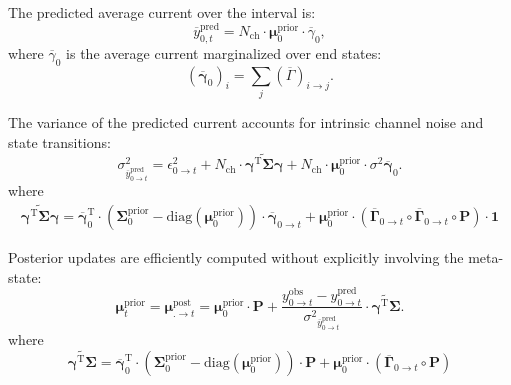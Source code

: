 \documentclass[pdflatex,sn-mathphys-num]{sn-jnl}%
\theoremstyle{thmstyleone}%
\theoremstyle{thmstyletwo}%
\theoremstyle{thmstylethree}%
\begin{document}
The predicted average current over the interval is:
\begin{equation}
	\overline{y}^{\text{pred}}_{0,t} = N_{\text{ch}} \cdot \mathbf{\mu}^{\text{prior}}_{0} \cdot \overline{\gamma}_{0},
	\label{eq:macro_interval_predicted_y}
\end{equation}
where \( \overline{\gamma}_{0} \) is the average current marginalized over end states:
\begin{equation}
	(\overline{\mathbf{\gamma}}_{0})_i = \sum_j (\overline{\Gamma})_{i \rightarrow j}.
\end{equation}

The variance of the predicted current accounts for intrinsic channel noise and state transitions:
\begin{equation}
	\sigma^2_{\overline{y}^{\text{pred}}_{0 \rightarrow t}} = \epsilon^2_{0 \rightarrow t} + N_{\text{ch}} \cdot \widetilde{\mathbf{\gamma}^{\mathrm{T}} \mathbf{\Sigma}\mathbf{\gamma}} + 
	N_{\text{ch}} \cdot \mathbf{\mu}^{\mathrm{prior}}_{0} \cdot {\sigma^2 \overline{\mathbf{\gamma}}}_{0}.
	\label{eq:macro_interval_sigma_pred}
\end{equation}
where
\begin{multline}
	\widetilde{\mathbf{\gamma}^{\mathrm{T}} \mathbf{\Sigma}\mathbf{\gamma}}= 
	\overline{\mathbf{\gamma}}_{0}^{\mathrm{T}} \cdot 
	\left( \mathbf{\Sigma}^{\mathrm{prior}}_{0} - \mathrm{diag}(\mathbf{\mu}^{\mathrm{prior}}_0) \right) \cdot 
	\overline{\mathbf{\gamma}}_{0 \rightarrow t} 
	+ \mathbf{\mu}^{\mathrm{prior}}_0 \cdot \left( \overline{\mathbf{\Gamma}}_{0 \rightarrow t} \circ \overline{\mathbf{\Gamma}}_{0 \rightarrow t} \circ \mathbf{P} \right) \cdot \mathbf{1}
	\label{eq:simplified_meta_state}
\end{multline}



Posterior updates are efficiently computed without explicitly involving the meta-state:
\begin{equation}
	\boldsymbol{\mu}^{\mathrm{prior}}_{t} = \boldsymbol{\mu}^{\mathrm{post}}_{. \rightarrow t} = \boldsymbol{\mu}^{\mathrm{prior}}_0 \cdot \boldsymbol{P} + 
	\frac{y^{\mathrm{obs}}_{0 \rightarrow t} - y^{\mathrm{pred}}_{0 \rightarrow t}}{{\sigma^2}_{\overline{y}^{\mathrm{pred}}_{0 \rightarrow t}}} 
	\cdot \widetilde{\boldsymbol{\gamma}^{\mathrm{T}} \boldsymbol{\Sigma}}.
	\label{eq:macro_interval_posterior_mean}
\end{equation}
where
\begin{equation}
	\widetilde{\boldsymbol{\gamma}^{\mathrm{T}} \boldsymbol{\Sigma}}= \overline{\boldsymbol{\gamma}}_{0}^{\mathrm{T}} \cdot 
	\left( \boldsymbol{\Sigma}^{\mathrm{prior}}_{0} - \mathrm{diag}(\boldsymbol{\mu}^{\mathrm{prior}}_0) \right) \cdot \boldsymbol{P} 
	+ \boldsymbol{\mu}^{\mathrm{prior}}_0 \cdot \left( \overline{\boldsymbol{\Gamma}}_{0 \rightarrow t} \circ \boldsymbol{P} \right)
	\label{eq:interval_gamma_sigma}
\end{equation}
\end{document}
